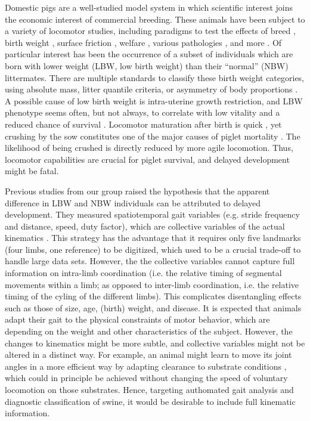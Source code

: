 Domestic pigs are a well-studied model system in which scientific interest joins the economic interest of commercial breeding.
These animals have been subject to a variety of locomotor studies, including paradigms to test the effects of breed \citep{Mirkiani2021}, birth weight \citep{VandenHole2017,VandenHole2018,VandenHole2021}, surface friction \citep{VanWachenfelt2008}, welfare \citep{Guesgen2017}, various pathologies \citep{Abell2014,LaVallee2020,Benasson2020}, and more \citep[\textit{cf.}][]{Netukova2021}.
Of particular interest has been the occurrence of a subset of individuals which are born with lower weight (LBW, low birth weight) than their ``normal'' (NBW) littermates.
There are multiple standards to classify these birth weight categories, using absolute mass, litter quantile criteria, or asymmetry of body proportions \citep{Quiniou2002,VanTichelen2021,Wang2016,DInca2011,Feldpausch2019,Roehe2000,Amdi2013}.
A possible cause of low birth weight is intra-uterine growth restriction, and LBW phenotype seems often, but not always, to correlate with low vitality and a reduced chance of survival \citep{Baxter2008,Hales2013,Muns2013,VanGinneken2022}.
Locomotor maturation after birth is quick \citep{Andersen2016,VandenHole2017}, yet crushing by the sow constitutes one of the major causes of piglet mortality \citep{Marchant2000,Edwards2015}.
The likelihood of being crushed is directly reduced by more agile locomotion.
Thus, locomotor capabilities are crucial for piglet survival, and delayed development might be fatal.

Previous studies from our group \citep{VandenHole2017,VandenHole2021} raised the hypothesis that the apparent difference in LBW and NBW individuals can be attributed to delayed development.
They measured spatiotemporal gait variables (e.g. stride frequency and distance, speed, duty factor), which are collective variables of the actual kinematics \citep[\textit{cf.}][]{Newell2021,Nishikawa2007,Aerts2000}.
This strategy has the advantage that it requires only five landmarks (four limbs, one reference) to be digitized, which used to be a crucial trade-off to handle large data sets.
However, the the collective variables cannot capture full information on intra-limb coordination (i.e. the relative timing of segmental movements within a limb; as opposed to inter-limb coordination, i.e. the relative timing of the cyling of the different limbs).
This complicates disentangling effects such as those of size, age, (birth) weight, and disease.
It is expected that animals adapt their gait to the physical constraints of motor behavior, which are depending on the weight and other characteristics of the subject.
However, the changes to kinematics might be more subtle, and collective variables might not be altered in a distinct way.
For example, an animal might learn to move its joint angles in a more efficient way by adapting clearance to substrate conditions \citep{VanWachenfelt2008}, which could in principle be achieved without changing the speed of voluntary locomotion on those substrates.
Hence, targeting authomated gait analysis and diagnostic classification of swine, it would be desirable to include full kinematic information.


